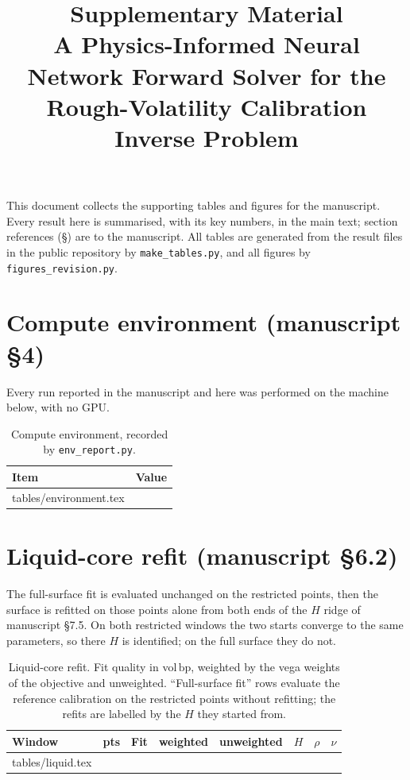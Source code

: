 \documentclass[11pt,a4paper]{article}
\title{Supplementary Material\\[0.4em]
\large A Physics-Informed Neural Network Forward Solver for the\\
Rough-Volatility Calibration Inverse Problem}
\date{}
\makeatletter
\newcommand{\bp}{\ensuremath{\,\mathrm{bp}}}
\newcommand{\revrows}[1]{\@@input tables/#1.tex }
\makeatother
\begin{document}
\maketitle
\vspace{-2.5em}

This document collects the supporting tables and figures for the manuscript.
Every result here is summarised, with its key numbers, in the main text; section
references (\S) are to the manuscript. All tables are generated from the result
files in the public repository by \texttt{make\_tables.py}, and all figures by
\texttt{figures\_revision.py}.

\section{Compute environment (manuscript \S4)}
Every run reported in the manuscript and here was performed on the machine
below, with no GPU.

\begin{table}[h]
\centering
\caption{Compute environment, recorded by \texttt{env\_report.py}.}
\label{tab:S-env}
\small
\begin{tabular}{@{}l l@{}}
\toprule
Item & Value \\
\midrule
\revrows{environment}
\bottomrule
\end{tabular}
\end{table}

\section{Liquid-core refit (manuscript \S6.2)}
The full-surface fit is evaluated unchanged on the restricted points, then the
surface is refitted on those points alone from both ends of the $H$ ridge of
manuscript \S7.5. On both restricted windows the two starts converge to the same
parameters, so there $H$ is identified; on the full surface they do not.

\begin{table}[h]
\centering
\caption{Liquid-core refit. Fit quality in vol\bp, weighted by the vega weights
of the objective and unweighted. ``Full-surface fit'' rows evaluate the reference
calibration on the restricted points without refitting; the refits are labelled
by the $H$ they started from.}
\label{tab:S-liquid}
\footnotesize
\begin{tabular}{@{}l r l r r r r r@{}}
\toprule
Window & pts & Fit & weighted & unweighted & $H$ & $\rho$ & $\nu$ \\
\midrule
\revrows{liquid}
\bottomrule
\end{tabular}
\end{table}
\end{document}
